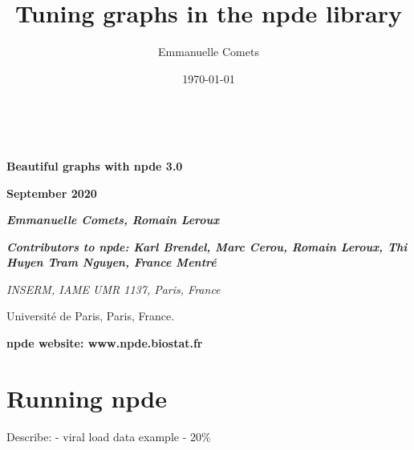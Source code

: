 \documentclass{article}
\title{Tuning graphs in the npde library}
\author{Emmanuelle Comets}
\date{\today}
\begin{document}


\pagestyle{fancy}
\renewcommand{\headrulewidth}{0pt}
\renewcommand{\footrulewidth}{1pt}
\lhead{}
\chead{}
\rhead{}
\rfoot{\thepage}

\renewenvironment{Schunk}{\vspace{\topsep}}{\vspace{\topsep}}

\parindent 18pt
$\phantom{minime}$

\vskip 3cm
\begin{center}
{\setlength{\baselineskip}{2\baselineskip}
{\Large \bfseries Beautiful graphs with npde 3.0}

{\Large \bfseries September 2020}

\bigskip 

{\Large \itshape \bfseries Emmanuelle Comets, Romain Leroux}

\bigskip 

\bigskip 

{\large \itshape \bfseries Contributors to npde: Karl Brendel, Marc Cerou, Romain Leroux, Thi Huyen Tram Nguyen, France Mentr\'e}

\bigskip
{\it
INSERM, IAME UMR 1137, Paris, France

Universit\'e de Paris, Paris, France.
}
\par}
\end{center}

\vskip 8cm
\begin{center}
{\large \bfseries npde website: www.npde.biostat.fr}
\end{center}

\newpage

\section{Running npde }

Describe:
- viral load data example
  - 20\% 
\end{document}
